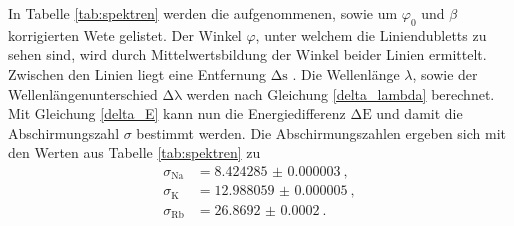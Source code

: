 In Tabelle \ref{tab:spektren} werden die aufgenommenen, sowie um $\varphi_0$ und $\beta$ korrigierten Wete gelistet. Der Winkel $\varphi$, unter welchem die Liniendubletts zu sehen sind, wird durch Mittelwertsbildung der Winkel beider Linien ermittelt. Zwischen den Linien liegt eine Entfernung $\mathup{\Delta{s}}$ . Die Wellenlänge $\lambda$, sowie der Wellenlängenunterschied $\mathup{\Delta{\lambda}}$ werden nach Gleichung \eqref{delta_lambda} berechnet. Mit Gleichung \eqref{delta_E} kann nun die Energiedifferenz $\mathup{\Delta{E}}$ und damit die Abschirmungszahl $\sigma$ bestimmt werden.
Die Abschirmungszahlen ergeben sich mit den Werten aus Tabelle \ref{tab:spektren} zu 
\begin{align}
\sigma_\mathup{Na}&=\SI{8.424285(3)}{}, \\
\sigma_\mathup{K\:}&=\SI{12.988059(5)}{},\\
\sigma_\mathup{Rb}&=\SI{26.8692(2)}{}.
\end{align}
